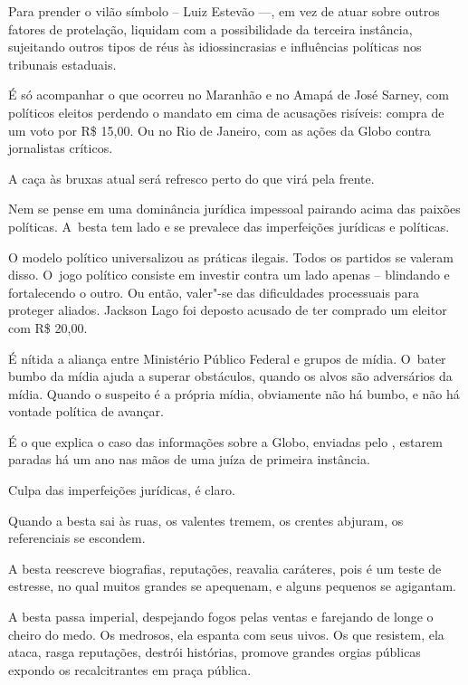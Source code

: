 Para prender o vilão símbolo -- Luiz Estevão \mbox{---,} em vez de atuar sobre
outros fatores de protelação, liquidam com a possibilidade da terceira
instância, sujeitando outros tipos de réus às idiossincrasias e
influências políticas nos tribunais estaduais.

É só acompanhar o que ocorreu no Maranhão e no Amapá de José Sarney, com
políticos eleitos perdendo o mandato em cima de acusações risíveis:
compra de um voto por R\$ 15,00. Ou no Rio de Janeiro, com as ações da
Globo contra jornalistas críticos.

A caça às bruxas atual será refresco perto do que virá pela frente.

\asterisc{}

Nem se pense em uma dominância jurídica impessoal pairando acima das
paixões políticas. A~besta tem lado e se prevalece das imperfeições
jurídicas e políticas.

O modelo político universalizou as práticas ilegais. Todos os partidos
se valeram disso. O~jogo político consiste em investir contra um lado
apenas -- blindando e fortalecendo o outro. Ou então, valer"-se das
dificuldades processuais para proteger aliados. Jackson Lago foi deposto
acusado de ter comprado um eleitor com R\$ 20,00.

É nítida a aliança entre Ministério Público Federal e grupos de mídia. O~bater bumbo da mídia ajuda a superar obstáculos, quando os alvos são
adversários da mídia. Quando o suspeito é a própria mídia, obviamente
não há bumbo, e não há vontade política de avançar.

É o que explica o caso das informações sobre a Globo, enviadas pelo ,
estarem paradas há um ano nas mãos de uma juíza de primeira instância.

Culpa das imperfeições jurídicas, é claro.

\asterisc{}

Quando a besta sai às ruas, os valentes tremem, os crentes abjuram, os
referenciais se escondem.

A besta reescreve biografias, reputações, reavalia caráteres, pois é um
teste de estresse, no qual muitos grandes se apequenam, e alguns
pequenos se agigantam.

A besta passa imperial, despejando fogos pelas ventas e farejando de
longe o cheiro do medo. Os medrosos, ela espanta com seus uivos. Os que
resistem, ela ataca, rasga reputações, destrói histórias, promove
grandes orgias públicas expondo os recalcitrantes em praça pública.

